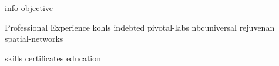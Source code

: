 \documentclass[10pt]{article}
\begin{document}
{info}
{objective}
\begin{section}{Professional Experience}
  {kohls}
  {indebted}
  {pivotal-labs}
  {nbcuniversal}
  {rejuvenan}
  {spatial-networks}
\end{section}
{skills}
{certificates}
{education}
\end{document}
